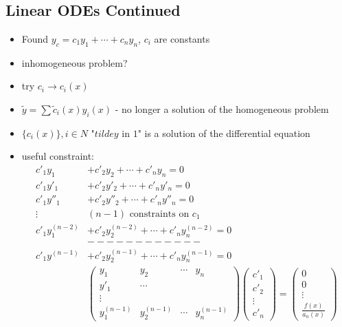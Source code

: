 \documentclass[Maths.tex]{subfiles}
\begin{document}
\chapter{}
\section{Linear ODEs Continued}
\begin{itemize}
    \item Found $y_c = c_1y_1 + \cdots + c_ny_n$, $c_i$ are constants
    \item inhomogeneous problem?
    \item try $c_i \to c_i(x)$
    \item $\tilde{y} = \sum \tilde{c}_i(x)y_i(x)$ - no longer a solution of the homogeneous problem
    \item $\{c_i(x)\}, i \in N$ "$tilde{y}$ in $1$" is a solution of the differential equation
    \item useful constraint:
    \begin{align*}
        c'_1y_1 &+ c'_2y_2 + \cdots + c'_ny_n = 0 \\
        c'_1y'_1 &+ c'_2y'_2 + \cdots + c'_ny'_n = 0 \\
        c'_1y''_1 &+ c'_2y''_2 + \cdots + c'_ny''_n = 0 \\
        \vdots ~ &(n-1) \text{ constraints on }c_1 \\
        c'_1y^{(n-2)}_1 &+ c'_2y^{(n-2)}_2 + \cdots + c'_ny^{(n-2)}_n = 0 \\
        & ------------ \\
        c'_1y^{(n-1)} &+ c'_2y^{(n-1)}_2 + \cdots + c'_ny^{(n-1)}_n = 0 \\
        &\begin{pmatrix} y_1 & y_2 & \cdots & y_n \\ y'_1 & \cdots & & \\ \vdots & & & \\ y_1^{(n-1)} & y_2^{(n-1)} & \cdots & y_n^{(n-1)}\end{pmatrix} \begin{pmatrix} c'_1 \\ c'_2 \\ \vdots \\ c'_n \end{pmatrix} = \begin{pmatrix} 0 \\ 0 \\ \vdots \\ \frac{f(x)}{a_n(x)} \end{pmatrix}
    \end{align*}
\end{itemize}
\end{document}
